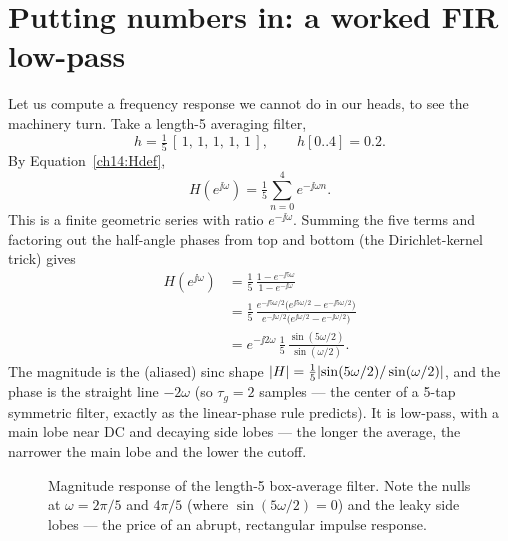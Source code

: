 \section{Putting numbers in: a worked FIR low-pass}
\label{ch14:firworked}

Let us compute a frequency response we cannot do in our heads, to see the
machinery turn. Take a length-5 averaging filter,
\[
  h = \tfrac15\,[\,1,\,1,\,1,\,1,\,1\,], \qquad h[0..4]=0.2.
\]
By Equation~\eqref{ch14:Hdef},
\[
  H(e^{\jj\omega}) = \tfrac15\sum_{n=0}^{4} e^{-\jj\omega n}.
\]
This is a finite geometric series with ratio $e^{-\jj\omega}$. Summing the five terms and factoring out the half-angle phases from top and bottom (the Dirichlet-kernel trick) gives
\begin{align*}
  H(e^{\jj\omega})
  &= \frac{1}{5}\,\frac{1 - e^{-\jj 5\omega}}{1 - e^{-\jj\omega}} \\
  &= \frac{1}{5}\,\frac{e^{-\jj 5\omega/2}\bigl(e^{\jj 5\omega/2} - e^{-\jj 5\omega/2}\bigr)}
                      {e^{-\jj\omega/2}\bigl(e^{\jj\omega/2} - e^{-\jj\omega/2}\bigr)} \\
  &= e^{-\jj 2\omega}\,\frac{1}{5}\,\frac{\sin(5\omega/2)}{\sin(\omega/2)}.
\end{align*}
The magnitude is the (aliased) sinc shape
$\lvert H\rvert = \tfrac15\lvert\sin(5\omega/2)/\sin(\omega/2)\rvert$, and the phase is the
straight line $-2\omega$ (so $\tau_g = 2$ samples --- the center of a 5-tap
symmetric filter, exactly as the linear-phase rule predicts). It is low-pass,
with a main lobe near DC and decaying side lobes --- the longer the average, the
narrower the main lobe and the lower the cutoff.

\begin{figure}[H]
\centering
{}
\caption{Magnitude response of the length-5 box-average filter. Note the nulls
at $\omega = 2\pi/5$ and $4\pi/5$ (where $\sin(5\omega/2)=0$) and the leaky side
lobes --- the price of an abrupt, rectangular impulse response.}
\label{ch14:fig-box5}
\end{figure}

